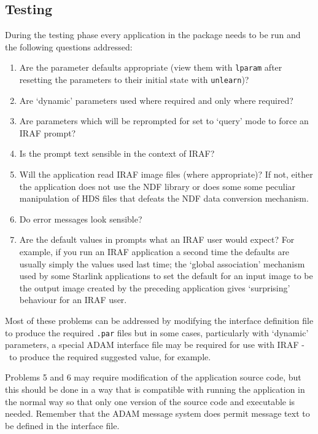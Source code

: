 \documentclass[twoside,11pt]{article}
\newcommand{\htmlref}[2]{#1}
\newcommand{\xlabel}[1]{}
\newcommand{\dash}{--}
\renewcommand{\dash}{-}
\begin{document}
\subsection{\xlabel{testing}Testing}

During the testing phase every application in the package needs to be run
and the following questions addressed:

\begin{enumerate}

\item \label{pardefs}Are the parameter defaults appropriate
(view them with \texttt{lparam}
after resetting the parameters to their initial state with \texttt{unlearn})?

\item \label{dynamic} Are
\htmlref{`dynamic' parameters}{dynamic_parameters}
used where required and only where required?

\item \label{repeated} Are parameters which will be reprompted for set to
`query' mode to force an IRAF prompt?

\item \label{prompt}Is the prompt text sensible in the context of IRAF?

\item \label{images}Will the application read IRAF image files
(where appropriate)? If not,
either the application does not use the NDF library or does some some
peculiar manipulation of HDS files that defeats the NDF data conversion
mechanism.

\item \label{error}Do error messages look sensible?

\item \label{promptdefs}Are the default values in prompts what
an IRAF user would expect?
For example, if you run an IRAF application a second time the defaults are
usually simply the values used last time; the `global association' mechanism
used by some Starlink applications to set the default for an input image to be
the output image created by the preceding application gives `surprising'
behaviour for an IRAF user.

\end{enumerate}

Most of these problems can be addressed by modifying the interface definition
file to produce the required \texttt{.par} files but in some cases, particularly
with `dynamic' parameters, a special ADAM interface file may be required for
use with IRAF \dash\ to produce the required suggested value, for example.

Problems 5 and 6 may require modification of the application
source code, but this should be done in a way that is compatible with running
the application in the normal way so that only one version of the source
code and executable is needed.  Remember that the ADAM message system does
permit message text to be defined in the interface file.
\end{document}
